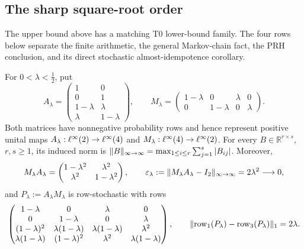 \subsection*{The sharp square-root order}

The upper bound above has a matching T0 lower-bound family.  The four rows below separate
the finite arithmetic, the general Markov-chain fact, the PRH conclusion, and its direct
stochastic almost-idempotence corollary.

\begin{lemma}\label{lem:prh-sharpness-family-arithmetic}
For $0<\lambda<\tfrac12$, put
\[
A_\lambda=\begin{pmatrix}1&0\\0&1\\1-\lambda&\lambda\\\lambda&1-\lambda\end{pmatrix},
\qquad
M_\lambda=\begin{pmatrix}1-\lambda&0&\lambda&0\\0&1-\lambda&0&\lambda\end{pmatrix}.
\]
Both matrices have nonnegative probability rows and hence represent positive unital maps
$A_\lambda:\ell^{\infty}(2)\to\ell^{\infty}(4)$ and $M_\lambda:\ell^{\infty}(4)\to\ell^{\infty}(2)$.  For every
$B\in\mathbb R^{r\times s}$, $r,s\ge1$, its induced norm is
$\lVert B \rVert_{\infty\to\infty}=\max_{1\le i\le r}\sum_{j=1}^{s}|B_{ij}|$.  Moreover,
\[
M_\lambda A_\lambda=\begin{pmatrix}1-\lambda^2&\lambda^2\\\lambda^2&1-\lambda^2\end{pmatrix},
\qquad \varepsilon_\lambda:=\lVert M_\lambda A_\lambda-I_2 \rVert_{\infty\to\infty}=2\lambda^2\longrightarrow0,
\]
and $P_\lambda:=A_\lambda M_\lambda$ is row-stochastic with rows
\[
\begin{pmatrix}
1-\lambda&0&\lambda&0\\
0&1-\lambda&0&\lambda\\
(1-\lambda)^2&\lambda(1-\lambda)&\lambda(1-\lambda)&\lambda^2\\
\lambda(1-\lambda)&(1-\lambda)^2&\lambda^2&\lambda(1-\lambda)
\end{pmatrix},
\qquad \lVert \operatorname{row}_1(P_\lambda)-\operatorname{row}_3(P_\lambda) \rVert_{1}=2\lambda.
\]
\end{lemma}

